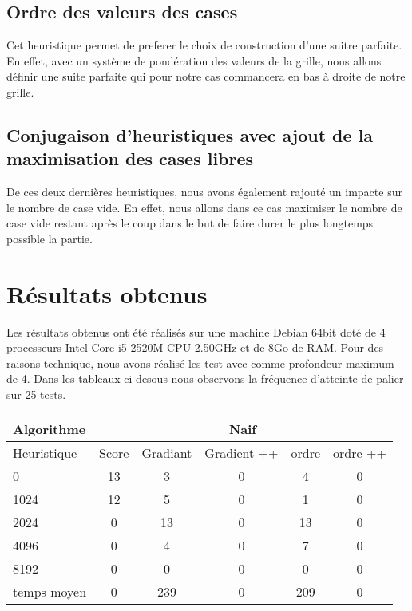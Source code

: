\documentclass[11pt,a4paper]{article}
\begin{document}
\subsection{Ordre des valeurs des cases}
Cet heuristique permet de preferer le choix de construction d'une suitre parfaite. En effet, avec un système de pondération des valeurs de la grille, nous allons définir une suite parfaite qui pour notre cas commancera en bas à droite de notre grille.

\subsection{Conjugaison d'heuristiques avec ajout de la maximisation des cases libres}
De ces deux dernières heuristiques, nous avons également rajouté un impacte sur le nombre de case vide. En effet, nous allons dans ce cas maximiser le nombre de case vide restant après le coup dans le but de faire durer le plus longtemps possible la partie.

\newpage
\section{Résultats obtenus}

Les résultats obtenus ont été réalisés sur une machine Debian 64bit doté de 4 processeurs Intel Core i5-2520M CPU \@ 2.50GHz et de 8Go de RAM. Pour des raisons technique, nous avons réalisé les test avec comme profondeur maximum de 4. Dans les tableaux ci-desous nous observons la fréquence d'atteinte de palier sur 25 tests.

\begin{tabular}{|l|c|c|c|c|c|} 
   \hline
    Algorithme & \multicolumn{5}{c|}{ Naif } \\
    \hline
    Heuristique & Score & Gradiant & Gradient ++ & ordre & ordre ++ \\
    \hline
    0 & 13 & 3 & 0 & 4 & 0\\
    \hline
    1024 & 12 & 5 & 0 & 1 & 0\\
    \hline
    2024 & 0 & 13 & 0 & 13 & 0 \\
    \hline
    4096 & 0 & 4 & 0 & 7 & 0 \\
    \hline
    8192 & 0 & 0 & 0 & 0 & 0 \\
    \hline
    temps moyen & 0 & 239 & 0 & 209 & 0 \\
    \hline
\end{tabular}



\vspace{2cm}
\end{document}
